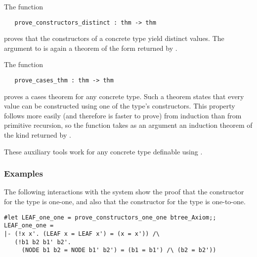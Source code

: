 {{The function 

\begin{boxed}
\begin{verbatim}
   prove_constructors_distinct : thm -> thm
\end{verbatim}\end{boxed}

\noindent proves that the constructors
 of a concrete type yield distinct values.  The argument to
 is again 
a theorem of the form returned by .

The function

\begin{boxed}
\begin{verbatim}
   prove_cases_thm : thm -> thm
\end{verbatim}\end{boxed}

\noindent proves a cases
 theorem for any concrete type.  Such a theorem states that every
value can be constructed using one of the type's constructors.  This property
follows more easily (and therefore is faster to prove) from induction than from
primitive recursion, so the function  takes as an
argument an induction theorem of the kind returned by
.

These auxiliary tools work for any concrete type definable using
.

\subsubsection{Examples}

The following interactions with the system show the proof that the constructor
 for the type   is one-one,
and also that the constructor  for the type  is one-to-one.

\begin{session}\begin{verbatim}
#let LEAF_one_one = prove_constructors_one_one btree_Axiom;;
LEAF_one_one = 
|- (!x x'. (LEAF x = LEAF x') = (x = x')) /\
   (!b1 b2 b1' b2'.
     (NODE b1 b2 = NODE b1' b2') = (b1 = b1') /\ (b2 = b2'))


\end{verbatim}
\end{session}}}
